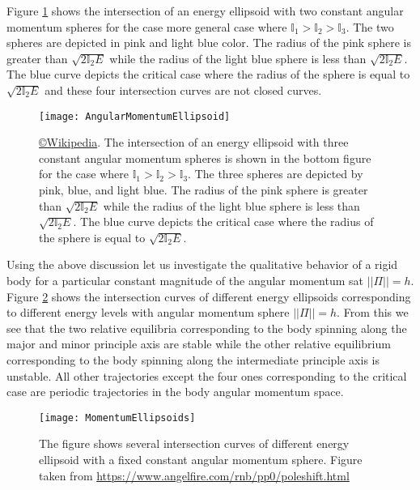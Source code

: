 \documentclass[graybox,envcountchap,sectrefs]{svmonoMuga}
\begin{document}
Figure \ref{Fig:IntersectionEandPi} shows the intersection of an energy ellipsoid with two constant angular momentum spheres for the case more general case where $\mathbb{I}_1>\mathbb{I}_2>\mathbb{I}_3$. The two spheres are depicted in pink and light blue color. The radius of the pink sphere is greater than $\sqrt{2\mathbb{I}_2E}$ while the radius of the light blue sphere is less than $\sqrt{2\mathbb{I}_2E}$. The blue curve depicts the critical case where the radius of the sphere is equal to $\sqrt{2\mathbb{I}_2E}$ and these four intersection curves are not closed curves.





\begin{figure}[ht]
\begin{center}
\texttt{[image: AngularMomentumEllipsoid]}
\renewcommand{\baselinestretch}{1}\selectfont
\caption{\href{https://en.wikipedia.org/wiki/File:Ellipsoid-KSE-4-5.svg}{\copyright Wikipedia}. The intersection of an energy ellipsoid with three constant angular momentum spheres is shown in the bottom figure for the case where $\mathbb{I}_1>\mathbb{I}_2>\mathbb{I}_3$. The three spheres are depicted by pink, blue, and light blue. The radius of the pink sphere is greater than $\sqrt{2\mathbb{I}_2E}$ while the radius of the light blue sphere is less than $\sqrt{2\mathbb{I}_2E}$. The blue curve depicts the critical case where the radius of the sphere is equal to $\sqrt{2\mathbb{I}_2E}$. }
\label{Fig:IntersectionEandPi}
\renewcommand{\baselinestretch}{1.5}\selectfont
\end{center}
\end{figure}


Using the above discussion let us investigate the qualitative behavior of a rigid body for a particular constant magnitude of the angular momentum sat $||\Pi||=h$. Figure \ref{Fig:AngularMomentumSphere} shows the intersection curves of different energy ellipsoids corresponding to different energy levels with angular momentum sphere $||\Pi||=h$. From this we see that the two relative equilibria corresponding to the body spinning along the major and minor principle axis are stable while the other relative equilibrium corresponding to the body spinning along the intermediate principle axis is unstable. All other trajectories except the four ones corresponding to the critical case are periodic trajectories in the body angular momentum space.

\begin{figure}[ht]
\begin{center}
\texttt{[image: MomentumEllipsoids]}
\renewcommand{\baselinestretch}{1}\selectfont
\caption{The figure shows several intersection curves of different energy ellipsoid with a fixed constant angular momentum sphere. Figure taken from \url{https://www.angelfire.com/rnb/pp0/poleshift.html}}
\label{Fig:AngularMomentumSphere}
\renewcommand{\baselinestretch}{1.5}\selectfont
\end{center}
\end{figure}
\end{document}
